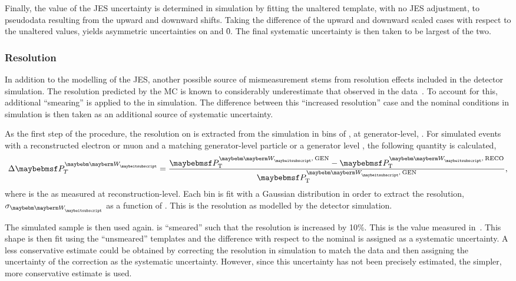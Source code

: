 Finally, the value of the \ac{JES} uncertainty is determined in simulation by
fitting the unaltered template, with no \ac{JES} adjustment, to pseudodata
resulting from the upward and downward shifts. Taking the difference of the
upward and downward scaled cases with respect to the unaltered values, yields
asymmetric uncertainties on \fLmfR and \f0. The final systematic uncertainty is
then taken to be largest of the two.

\subsubsection{\MET Resolution}
In addition to the modelling of the \ac{JES}, another possible source of
mismeasurement stems from resolution effects included in the detector
simulation. The resolution predicted by the \ac{MC} is known to considerably
underestimate that observed in the data~\cite{cms_met_paper,cms_met_pas}. To
account for this, additional ``smearing'' is applied to the \MET in
simulation. The difference between this ``increased resolution'' case and the
nominal conditions in simulation is then taken as an additional source of
systematic uncertainty.

As the first step of the procedure, the resolution on \PtW is extracted from the
simulation in bins of \PtW, at generator-level, \PtWgen . For simulated \Wjets
events with a reconstructed electron or muon and a matching generator-level
particle or a generator level \Ptau, the following quantity is calculated,
\begin{equation*}
\Delta\PtW = \frac{\PtWgen - \PtWreco}{\PtWgen},
\end{equation*}
where \PtWreco is the \PtW as measured at reconstruction-level. Each \PtWgen bin
is fit with a Gaussian distribution in order to extract the resolution,
$\sigma_{\PW}$ as a function of \PtW. This is the \PtW resolution as modelled by
the detector simulation.

The simulated sample is then used again. \PtWreco is ``smeared'' such that the
resolution is increased by 10\%. This is the value measured
in~\cite{cms_met_paper}. This shape is then fit using the ``unsmeared''
templates and the difference with respect to the nominal is assigned as a
systematic uncertainty. A less conservative estimate could be obtained by
correcting the resolution in simulation to match the data and then assigning the
uncertainty of the correction as the systematic uncertainty. However, since this
uncertainty has not been precisely estimated, the simpler, more conservative
estimate is used.

